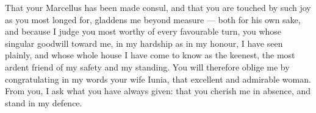 

 That your Marcellus has been made consul, and that you are touched by such joy as you most longed for, gladdens me beyond measure --- both for his own sake, and because I judge you most worthy of every favourable turn, you whose singular goodwill toward me, in my hardship as in my honour, I have seen plainly, and whose whole house I have come to know as the keenest, the most ardent friend of my safety and my standing. You will therefore oblige me by congratulating in my words your wife Iunia, that excellent and admirable woman. From you, I ask what you have always given: that you cherish me in absence, and stand in my defence.
